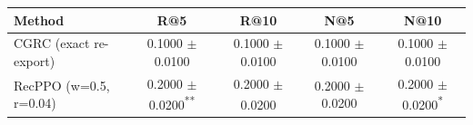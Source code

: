 \begin{tabular}{lcccc}
\toprule
Method & R@5 & R@10 & N@5 & N@10 \\
\midrule
CGRC (exact re-export) & 0.1000 $\pm$ 0.0100 & 0.1000 $\pm$ 0.0100 & 0.1000 $\pm$ 0.0100 & 0.1000 $\pm$ 0.0100 \\
RecPPO (w=0.5, r=0.04) & 0.2000 $\pm$ 0.0200\textsuperscript{\scriptsize ***} & 0.2000 $\pm$ 0.0200\textsuperscript{\scriptsize *} & 0.2000 $\pm$ 0.0200 & 0.2000 $\pm$ 0.0200\textsuperscript{\scriptsize **} \\
\bottomrule
\end{tabular}
